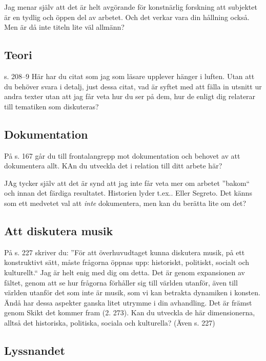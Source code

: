 \documentclass{article}
\begin{document}
Jag menar själv att det är helt avgörande för konstnärlig forskning att subjektet är en tydlig och öppen del av arbetet. Och det verkar vara din hållning också. Men är då inte titeln lite väl allmänn?



\subsection{Teori}

s. 208--9 Här har du citat som jag som läsare upplever hänger i luften. Utan att du behöver svara i detalj, just dessa citat, vad är syftet med att fälla in utsnitt ur andra texter utan att jag får veta hur du ser på dem, hur de enligt dig relaterar till tematiken som diskuteras?


\subsection{Dokumentation}

På s. 167 går du till frontalangrepp mot dokumentation och behovet av att dokumentera allt. KAn du utveckla det i relation till ditt arbete här?

JAg tycker själv att det är synd att jag inte får veta mer om arbetet ''bakom`` och innan det färdiga resultatet. Historien lyder t.ex.. Eller Segreto. Det känns som ett medvetet val att \emph{inte} dokumentera, men kan du berätta lite om det?


\subsection{Att diskutera musik}

På s. 227 skriver du: ''För att överhuvudtaget kunna diskutera musik, på ett konstruktivt sätt, måste frågorna öppnas upp: historiskt, politiskt, socialt och kulturellt.`` Jag är helt enig med dig om detta. Det är genom expansionen av fältet, genom att se hur frågorna förhåller sig till världen utanför, även till världen utanför det som inte är musik, som vi kan betrakta dynamiken i konsten. Ändå har dessa aspekter ganska litet utrymme i din avhandling. Det är främst genom Skikt det kommer fram (2. 273). Kan du utveckla de här dimensionerna, alltså det historiska, politiska, sociala och kulturella? (Även s. 227)


\subsection{Lyssnandet}
\end{document}
